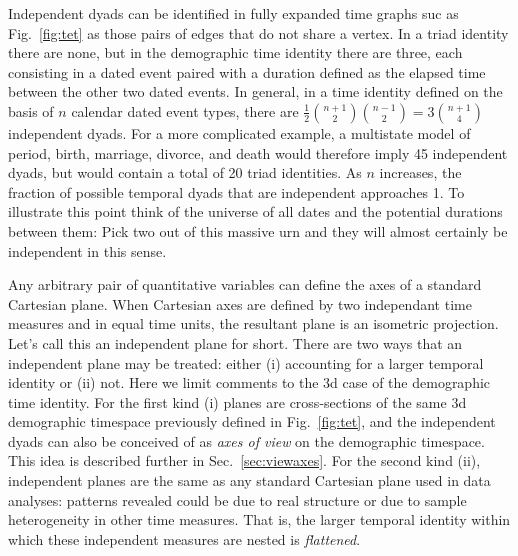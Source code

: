 Independent dyads can be identified in fully expanded time graphs suc as Fig.~\ref{fig:tet} as those pairs of edges that do not share a vertex. In a triad identity there are none, but in the demographic time identity there are three, each consisting in a dated event paired with a duration defined as the elapsed time between the other two dated events. In general, in a time identity defined on the basis of $n$ calendar dated event types, there are $\frac{1}{2}\binom{n+1}{2}\binom{n-1}{2} = 3\binom{n+1}{4}$ independent dyads. For a more complicated example, a multistate model of period, birth, marriage, divorce, and death would therefore imply 45 independent dyads, but would contain a total of 20 triad identities. As $n$ increases, the fraction of possible temporal dyads that are independent approaches 1. To illustrate this point think of the universe of all dates and the potential durations between them: Pick two out of this massive urn and they will almost certainly be independent in this sense.

Any arbitrary pair of quantitative variables can define the axes of a standard Cartesian plane. When Cartesian axes are defined by two independant time measures and in equal time units, the resultant plane is an isometric projection. Let's call this an independent plane for short. There are two ways that an independent plane may be treated: either (i) accounting for a larger temporal identity or (ii) not. Here we limit comments to the 3d case of the demographic time identity. For the first kind (i) planes are cross-sections of the same 3d demographic timespace previously defined in Fig.~\ref{fig:tet}, and the independent dyads can also be conceived of as \emph{axes of view} on the demographic timespace. This idea is described further in Sec.~\ref{sec:viewaxes}. For the second kind (ii), independent planes are the same as any standard Cartesian plane used in data analyses: patterns revealed could be due to real structure or due to sample heterogeneity in other time measures. That is, the larger temporal identity within which these independent measures are nested is \emph{flattened}.


